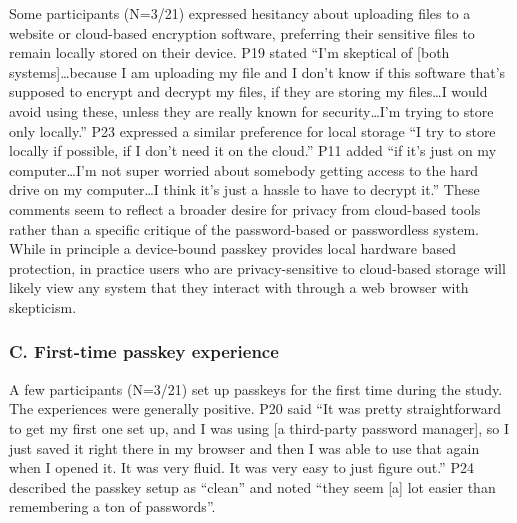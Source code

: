 Some participants (N=3/21) expressed hesitancy about uploading files to a website or cloud-based encryption software, preferring their sensitive files to remain locally stored on their device. P19 stated ``I'm skeptical of [both systems]\ldots because I am uploading my file and I don't know if this software that's supposed to encrypt and decrypt my files, if they are storing my files\ldots I would avoid using these, unless they are really known for security\ldots I'm trying to store only locally.'' P23 expressed a similar preference for local storage ``I try to store locally if possible, if I don't need it on the cloud.'' P11 added ``if it's just on my computer\ldots I'm not super worried about somebody getting access to the hard drive on my computer\ldots I think it's just a hassle to have to decrypt it.'' These comments seem to reflect a broader desire for privacy from cloud-based tools rather than a specific critique of the password-based or passwordless system. While in principle a device-bound passkey provides local hardware based protection, in practice users who are privacy-sensitive to cloud-based storage will likely view any system that they interact with through a web browser with skepticism.

\subsubsection*{C. First-time passkey experience}

A few participants (N=3/21) set up passkeys for the first time during the study. The experiences were generally positive. P20 said ``It was pretty straightforward to get my first one set up, and I was using [a third-party password manager], so I just saved it right there in my browser and then I was able to use that again when I opened it. It was very fluid. It was very easy to just figure out.'' P24 described the passkey setup as ``clean'' and noted ``they seem [a] lot easier than remembering a ton of passwords''.
